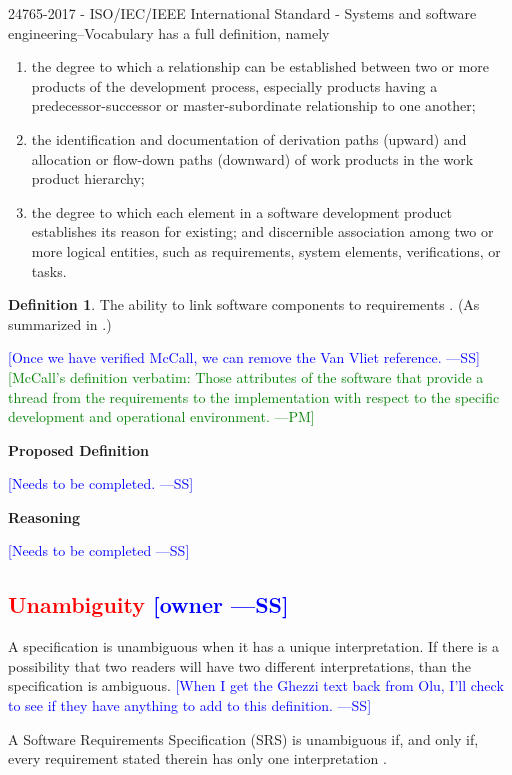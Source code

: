 \documentclass[letterpaper,cleveref]{lipics-v2019}
\newcommand{\authornote}[3]{\textcolor{#1}{[#3 ---#2]}}
\newcommand{\authornote}[3]{}
\newcommand{\wss}[1]{\authornote{blue}{SS}{#1}} %
\newcommand{\pmi}[1]{\authornote{green}{PM}{#1}} %
\newcommand{\notdone}[1]{\textcolor{red}{#1}}
\theoremstyle{definition}
\newtheorem{defn}{Definition}
\begin{document}
24765-2017 - ISO/IEC/IEEE International Standard - Systems and software
engineering--Vocabulary
has a full definition, namely
\begin{enumerate}
\item the degree to which a relationship can be established between two or more
  products of the development process, especially products having a
  predecessor-successor or master-subordinate relationship to one another;
\item the identification and documentation of derivation paths (upward) and
  allocation or flow-down paths (downward) of work products in the work product
  hierarchy;
\item the degree to which each element in a software development product
  establishes its reason for existing; and discernible association among two or
  more logical entities, such as requirements, system elements, verifications,
  or tasks.
\end{enumerate}

\begin{defn}
  The ability to link software components to requirements
  \citep{McCallEtAl1977}. (As summarized in \citet{VanVliet2000}.)
\end{defn} \wss{Once we have verified McCall, we can remove the Van Vliet
  reference.}  \pmi{McCall's definition verbatim: Those attributes of the software that provide a thread from the requirements to the implementation with respect to the specific development and operational environment.}

\noindent \textbf{Proposed Definition} 

\wss{Needs to be completed.}

\noindent \textbf{Reasoning}

\wss{Needs to be completed}

\subsection{\notdone{Unambiguity} \wss{owner}}

A specification is unambiguous when it has a unique interpretation.  If there is
a possibility that two readers will have two different interpretations, than the
specification is ambiguous.  \wss{When I get the Ghezzi text back from Olu, I'll
  check to see if they have anything to add to this definition.}

A Software Requirements Specification (SRS) is unambiguous if, and only if,
every requirement stated therein has only one interpretation \citep{IEEE1998}.
\end{document}
